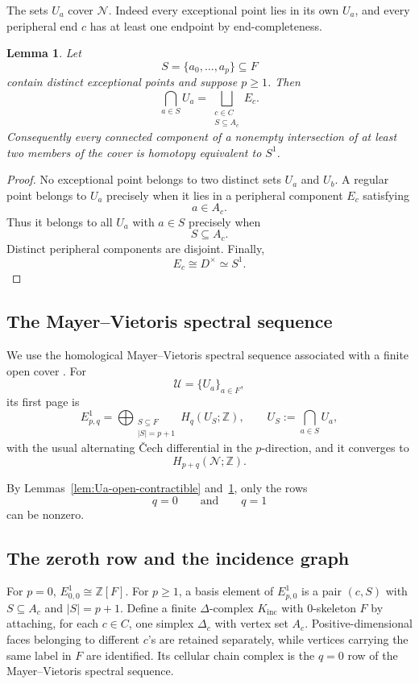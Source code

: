 \documentclass[11pt]{article}
\theoremstyle{plain}
\newtheorem{lemma}[theorem]{Lemma}
\theoremstyle{definition}
\begin{document}
The sets $U_a$ cover $\mathcal N$.  Indeed every exceptional point lies
in its own $U_a$, and every peripheral end $c$ has at least one endpoint
by end-completeness.

\begin{lemma}
\label{lem:Ua-intersections}
Let
\[
S=\{a_0,\ldots,a_p\}\subseteq F
\]
contain distinct exceptional points and suppose $p\geq1$.  Then
\[
\bigcap_{a\in S}U_a
=
\bigsqcup_{\substack{c\in C\\S\subseteq A_c}}E_c.
\]
Consequently every connected component of a nonempty intersection of at
least two members of the cover is homotopy equivalent to $S^1$.
\end{lemma}

\begin{proof}
No exceptional point belongs to two distinct sets $U_a$ and $U_b$.
A regular point belongs to $U_a$ precisely when it lies in a peripheral
component $E_c$ satisfying
\[
a\in A_c.
\]
Thus it belongs to all $U_a$ with $a\in S$ precisely when
\[
S\subseteq A_c.
\]
Distinct peripheral components are disjoint.  Finally,
\[
E_c\cong D^\times\simeq S^1.
\]
\end{proof}


\subsection{The Mayer--Vietoris spectral sequence}
\label{subsec:incidence-MVSS}

We use the homological Mayer--Vietoris spectral sequence associated with
a finite open cover \citep{McCleary2001}.  For
\[
\mathcal U=\{U_a\}_{a\in F},
\]
its first page is
\[
E^1_{p,q}
=
\bigoplus_{\substack{S\subseteq F\\|S|=p+1}}
H_q(U_S;\mathbb Z),
\qquad
U_S:=\bigcap_{a\in S}U_a,
\]
with the usual alternating Čech differential in the $p$-direction, and
it converges to
\[
H_{p+q}(\mathcal N;\mathbb Z).
\]

By Lemmas~\ref{lem:Ua-open-contractible}
and~\ref{lem:Ua-intersections},
only the rows
\[
q=0
\qquad\text{and}\qquad
q=1
\]
can be nonzero.


\subsection{The zeroth row and the incidence graph}
\label{subsec:MV-zero-row}

For $p=0$, $E^1_{0,0}\cong\mathbb Z[F]$.  For $p\geq1$, a basis element of
$E^1_{p,0}$ is a pair $(c,S)$ with $S\subseteq A_c$ and $|S|=p+1$.
Define a finite $\Delta$-complex $K_{\mathrm{inc}}$ with $0$-skeleton $F$ by
attaching, for each $c\in C$, one simplex $\Delta_c$ with vertex set $A_c$.
Positive-dimensional faces belonging to different $c$'s are retained
separately, while vertices carrying the same label in $F$ are identified.
Its cellular chain complex is the $q=0$ row of the Mayer--Vietoris spectral
sequence.
\end{document}
